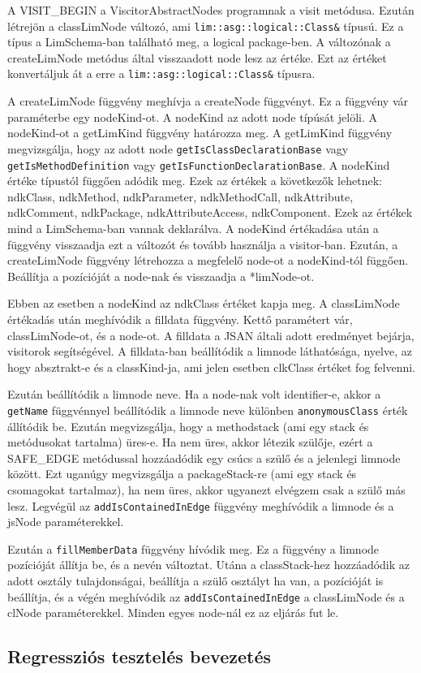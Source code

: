 A VISIT\_BEGIN a ViscitorAbstractNodes programnak a visit metódusa.
Ezután létrejön a classLimNode változó, ami \texttt{lim::asg::logical::Class\&} típusú.
Ez a típus a LimSchema-ban található meg, a logical package-ben.
A változónak a createLimNode metódus által visszaadott node lesz az értéke.
Ezt az értéket konvertáljuk át a erre a \texttt{lim::asg::logical::Class\&} típusra.

\noindent

A createLimNode függvény meghívja a createNode függvényt. Ez a függvény vár paraméterbe egy nodeKind-ot.
A nodeKind az adott node típúsát jelöli.
A nodeKind-ot a getLimKind függvény határozza meg.
A getLimKind függvény megvizsgálja, hogy az adott node \texttt{getIsClassDeclarationBase} vagy \texttt{getIsMethodDefinition} vagy \texttt{getIsFunctionDeclarationBase}.
A nodeKind értéke típustól függően adódik meg.
Ezek az értékek a következők lehetnek: ndkClass, ndkMethod, ndkParameter, ndkMethodCall, ndkAttribute, ndkComment, ndkPackage, ndkAttributeAccess, ndkComponent.
Ezek az értékek mind a LimSchema-ban vannak deklarálva. A nodeKind értékadása után a függvény visszaadja ezt a változót és tovább használja a visitor-ban.
Ezután, a createLimNode függvény létrehozza a megfelelő node-ot a nodeKind-tól függően. Beállítja a pozícióját a node-nak és visszaadja a *limNode-ot.

\noindent

Ebben az esetben a nodeKind az ndkClass értéket kapja meg.
A classLimNode értékadás után meghívódik a filldata függvény.
Kettő paramétert vár, classLimNode-ot, és a node-ot.
A filldata a JSAN általi adott eredményet bejárja, visitorok segítségével.
A filldata-ban beállítódik a limnode láthatósága, nyelve, az hogy absztrakt-e és a classKind-ja, ami jelen esetben clkClass értéket fog felvenni.

Ezután beállítódik a limnode neve. Ha a node-nak volt identifier-e, akkor a \texttt{getName} függvénnyel beállítódik a limnode neve különben \texttt{anonymousClass} érték állítódik be.
Ezután megvizsgálja, hogy a methodstack (ami egy stack és metódusokat tartalma) üres-e.
Ha nem üres, akkor létezik szülője, ezért a SAFE\_EDGE metódussal hozzáadódik egy csúcs a szülő és a jelenlegi limnode között.
Ezt uganúgy megvizsgálja a  packageStack-re (ami egy stack és csomagokat tartalmaz), ha nem üres, akkor ugyanezt elvégzem csak a szülő más lesz.
Legvégül az \texttt{addIsContainedInEdge} függvény meghívódik a limnode és a jsNode paraméterekkel.

\noindent

Ezután a \texttt{fillMemberData} függvény hívódik meg.
Ez a függvény a limnode pozícióját állítja be, és a nevén változtat.
Utána a classStack-hez hozzáadódik az adott osztály tulajdonságai, beállítja a szülő osztályt ha van, a pozícióját is beállítja, és a végén meghívódik az \texttt{addIsContainedInEdge} a classLimNode és a clNode paraméterekkel.
Minden egyes node-nál ez az eljárás fut le.

\subsection{Regressziós tesztelés bevezetés}
